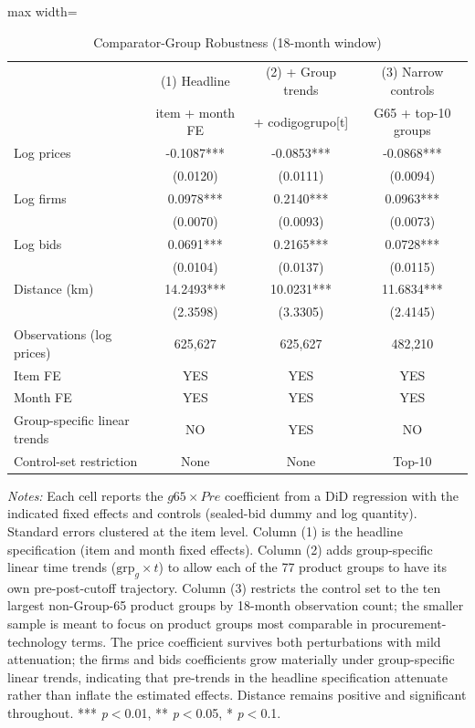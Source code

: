 \begin{table}[htbp]
\centering
\caption{Comparator-Group Robustness (18-month window)}
\label{tab:major2_controls}
\begin{adjustbox}{max width=\textwidth}
\begin{threeparttable}
\small
\begin{tabular}{lccc}
\toprule
 & (1) Headline & (2) + Group trends & (3) Narrow controls \\
 & item + month FE & + codigogrupo[t] & G65 + top-10 groups \\
\midrule
Log prices &       -0.1087*** &       -0.0853*** &       -0.0868*** \\
                                   &  (0.0120) &  (0.0111) &  (0.0094) \\
Log firms &       0.0978*** &       0.2140*** &       0.0963*** \\
                                   &  (0.0070) &  (0.0093) &  (0.0073) \\
Log bids &       0.0691*** &       0.2165*** &       0.0728*** \\
                                   &  (0.0104) &  (0.0137) &  (0.0115) \\
Distance (km) &       14.2493*** &       10.0231*** &       11.6834*** \\
                                   &  (2.3598) &  (3.3305) &  (2.4145) \\
\midrule
Observations (log prices) & 625,627 & 625,627 & 482,210 \\
Item FE & YES & YES & YES \\
Month FE & YES & YES & YES \\
Group-specific linear trends & NO & YES & NO \\
Control-set restriction & None & None & Top-10 \\
\bottomrule
\end{tabular}
\begin{tablenotes}
\small
\item \textit{Notes:} Each cell reports the $\mathit{g65}\times\mathit{Pre}$
coefficient from a DiD regression with the indicated fixed effects and
controls (sealed-bid dummy and log quantity). Standard errors clustered
at the item level. Column (1) is the headline specification (item and
month fixed effects). Column (2) adds group-specific linear time trends
($\text{grp}_g \times t$) to allow each of the 77 product groups to have
its own pre-post-cutoff trajectory. Column (3) restricts the control set
to the ten largest non-Group-65 product groups by 18-month observation
count; the smaller sample is meant to focus on product groups most
comparable in procurement-technology terms. The price coefficient
survives both perturbations with mild attenuation; the firms and bids
coefficients grow materially under group-specific linear trends,
indicating that pre-trends in the headline specification attenuate
rather than inflate the estimated effects. Distance remains positive
and significant throughout.
*** \textit{p}$<$0.01, ** \textit{p}$<$0.05, * \textit{p}$<$0.1.
\end{tablenotes}
\end{threeparttable}
\end{adjustbox}
\end{table}
